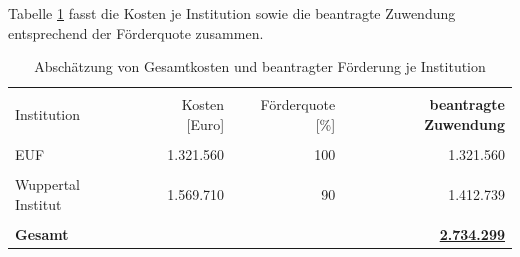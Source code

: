 \documentclass[a4paper,11pt,twoside]{scrartcl}
\begin{document}
Tabelle \ref{tab:kostenkalkulation2} fasst die Kosten je Institution sowie die beantragte Zuwendung entsprechend der Förderquote zusammen.

\begin{table}[h]
\small
\begin{center}
  \caption{Abschätzung von Gesamtkosten und beantragter Förderung je Institution}
\begin{tabular}[h]{|l | r | r | r|}
\hline
&&&\\
Institution & Kosten [Euro] & Förderquote [\%] & \textbf{beantragte Zuwendung}\\
\hline
\hline
 &&&\\
 EUF & 1.321.560 & 100 & 1.321.560\\
 \hline
 &&&\\
 Wuppertal Institut & 1.569.710 & 90 & 1.412.739
\\
 \hline
 \hline
 &&&\\
 \textbf{Gesamt} & & &\underline{\textbf{2.734.299}}\\
 \hline
 \end{tabular}
 \label{tab:kostenkalkulation2}
\end{center}
\end{table}

\clearpage
\footnotesize
%
%
%

%
%
%
%
%






\end{document}
